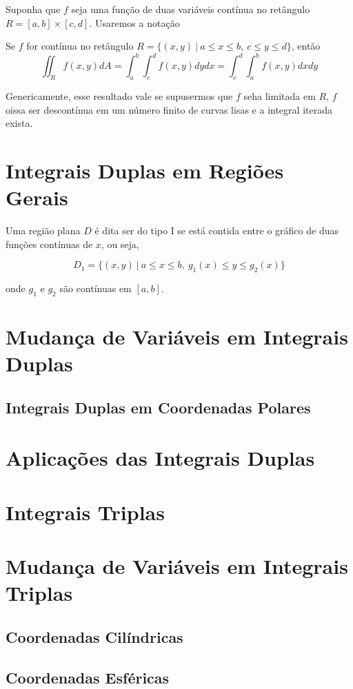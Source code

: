 Suponha que $f$ seja uma função de duas variáveis contínua no retângulo $R = [a,b] \times [c,d]$. Usaremos a notação

\begin{theorem}
 Se $f$ for contínua no retângulo $R = \{ (x,y) ~|~ a \le x \le b,~ c \le y \le d \}$, então
 \begin{equation}
  \iint_R f(x,y) dA = \int_a^b \int_c^d f(x,y) dy dx = \int_c^d \int_a^b f(x,y) dx dy
 \end{equation}
\end{theorem}

Genericamente, esse resultado vale se supusermos que $f$ seha limitada em $R$, $f$ oissa ser descontínua em um número finito de curvas lisas e a integral iterada exista.

\section{Integrais Duplas em Regiões Gerais}

Uma região plana $D$ é dita ser do tipo I se está contida entre o gráfico de duas funções contínuas de $x$, ou seja,

$$ D_1 = \{ (x,y) ~|~ a \le x \le b,~ g_1(x) \le y \le g_2(x) \} $$

onde $g_1$ e $g_2$ são contínuas em $[a,b]$.

\section{Mudança de Variáveis em Integrais Duplas}

\subsection{Integrais Duplas em Coordenadas Polares}

\section{Aplicações das Integrais Duplas}

\section{Integrais Triplas}

\section{Mudança de Variáveis em Integrais Triplas}

\subsection{Coordenadas Cilíndricas}

\subsection{Coordenadas Esféricas}
